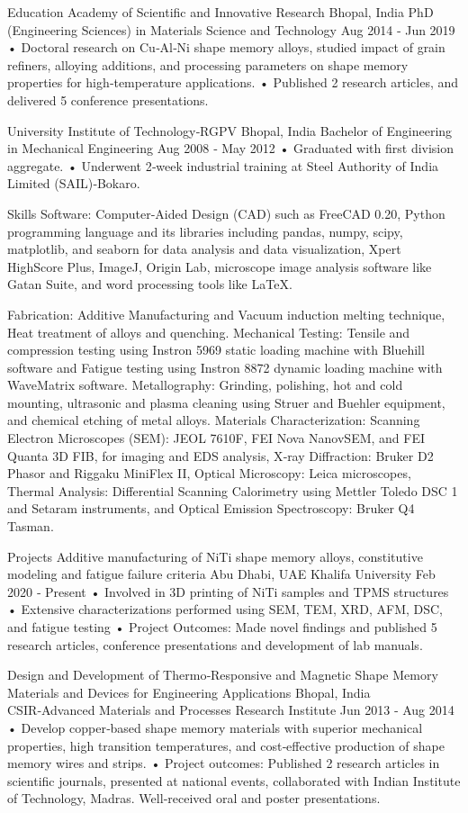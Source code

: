 Education
Academy of Scientific and Innovative Research Bhopal, India
PhD (Engineering Sciences) in Materials Science and Technology Aug 2014 ‑ Jun 2019
• Doctoral research on Cu‑Al‑Ni shape memory alloys, studied impact of grain refiners, alloying additions, and processing
parameters on shape memory properties for high‑temperature applications.
• Published 2 research articles, and delivered 5 conference presentations.

University Institute of Technology‑RGPV Bhopal, India
Bachelor of Engineering in Mechanical Engineering Aug 2008 ‑ May 2012
• Graduated with first division aggregate.
• Underwent 2‑week industrial training at Steel Authority of India Limited (SAIL)‑Bokaro.

Skills
Software: Computer‑Aided Design (CAD) such as FreeCAD 0.20, Python programming language and its libraries including
pandas, numpy, scipy, matplotlib, and seaborn for data analysis and data visualization, Xpert HighScore Plus,
ImageJ, Origin Lab, microscope image analysis software like Gatan Suite, and word processing tools like LaTeX.

Fabrication: Additive Manufacturing and Vacuum induction melting technique, Heat treatment of alloys and quenching.
Mechanical Testing: Tensile and compression testing using Instron 5969 static loading machine with Bluehill software
and Fatigue testing using Instron 8872 dynamic loading machine with WaveMatrix software.
Metallography: Grinding, polishing, hot and cold mounting, ultrasonic and plasma cleaning using Struer and Buehler
equipment, and chemical etching of metal alloys.
Materials Characterization: Scanning Electron Microscopes (SEM): JEOL 7610F, FEI Nova NanovSEM, and FEI Quanta
3D FIB, for imaging and EDS analysis, X‑ray Diffraction: Bruker D2 Phasor and Riggaku MiniFlex II, Optical Microscopy:
Leica microscopes, Thermal Analysis: Differential Scanning Calorimetry using Mettler Toledo DSC 1 and Setaram instruments,
and Optical Emission Spectroscopy: Bruker Q4 Tasman.

Projects
Additive manufacturing of NiTi shape memory alloys, constitutive
modeling and fatigue failure criteria Abu Dhabi, UAE
Khalifa University Feb 2020 ‑ Present
• Involved in 3D printing of NiTi samples and TPMS structures
• Extensive characterizations performed using SEM, TEM, XRD, AFM, DSC, and fatigue testing
• Project Outcomes: Made novel findings and published 5 research articles, conference presentations and development
of lab manuals.

Design and Development of Thermo‑Responsive and Magnetic Shape
Memory Materials and Devices for Engineering Applications Bhopal, India
CSIR‑Advanced Materials and Processes Research Institute Jun 2013 ‑ Aug 2014
• Develop copper‑based shape memory materials with superior mechanical properties, high transition temperatures,
and cost‑effective production of shape memory wires and strips.
• Project outcomes: Published 2 research articles in scientific journals, presented at national events, collaborated
with Indian Institute of Technology, Madras. Well‑received oral and poster presentations.

